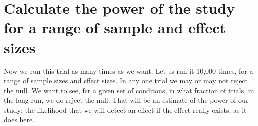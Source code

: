 \documentclass[
  letterpaper,
  DIV=11,
  numbers=noendperiod]{scrreprt}
\newenvironment{Shaded}{\begin{snugshade}}{\end{snugshade}}
\newcommand{\CommentTok}[1]{\textcolor[rgb]{0.37,0.37,0.37}{#1}}
\newcommand{\ControlFlowTok}[1]{\textcolor[rgb]{0.00,0.23,0.31}{\textbf{#1}}}
\newcommand{\DecValTok}[1]{\textcolor[rgb]{0.68,0.00,0.00}{#1}}
\newcommand{\FunctionTok}[1]{\textcolor[rgb]{0.28,0.35,0.67}{#1}}
\newcommand{\NormalTok}[1]{\textcolor[rgb]{0.00,0.23,0.31}{#1}}
\newcommand{\OtherTok}[1]{\textcolor[rgb]{0.00,0.23,0.31}{#1}}
\newcommand{\SpecialCharTok}[1]{\textcolor[rgb]{0.37,0.37,0.37}{#1}}
\begin{document}
\begin{Shaded}
\end{Shaded}

\section{Calculate the power of the study for a range of sample and
effect
sizes}\label{calculate-the-power-of-the-study-for-a-range-of-sample-and-effect-sizes}

Now we run this trial as many times as we want. Let us run it 10,000
times, for a range of sample sizes and effect sizes. In any one trial we
may or may not reject the null. We want to see, for a given set of
conditons, in what fraction of trials, in the long run, we do reject the
null. That will be an estimate of the power of our study: the likelihood
that we will detect an effect if the effect really exists, as it does
here.
\end{document}
